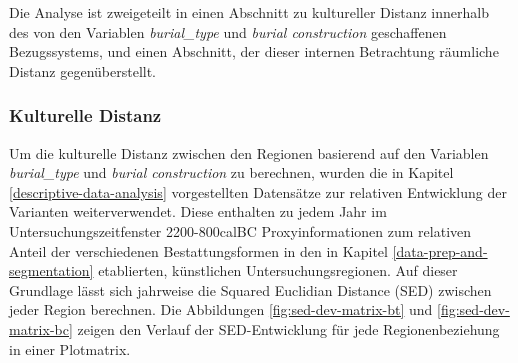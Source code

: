 \documentclass[openany,twoside,twocolumn]{book}
\begin{document}
Die Analyse ist zweigeteilt in einen Abschnitt zu kultureller Distanz
innerhalb des von den Variablen \emph{burial\_type} und \emph{burial
construction} geschaffenen Bezugssystems, und einen Abschnitt, der
dieser internen Betrachtung räumliche Distanz gegenüberstellt.

\hypertarget{kulturelle-distanz}{%
\subsubsection{Kulturelle Distanz}\label{kulturelle-distanz}}

Um die kulturelle Distanz zwischen den Regionen basierend auf den
Variablen \emph{burial\_type} und \emph{burial construction} zu
berechnen, wurden die in Kapitel \ref{descriptive-data-analysis}
vorgestellten Datensätze zur relativen Entwicklung der Varianten
weiterverwendet. Diese enthalten zu jedem Jahr im
Untersuchungszeitfenster 2200-800calBC Proxyinformationen zum relativen
Anteil der verschiedenen Bestattungsformen in den in Kapitel
\ref{data-prep-and-segmentation} etablierten, künstlichen
Untersuchungsregionen. Auf dieser Grundlage lässt sich jahrweise die
Squared Euclidian Distance (SED) zwischen jeder Region berechnen. Die
Abbildungen \ref{fig:sed-dev-matrix-bt} und \ref{fig:sed-dev-matrix-bc}
zeigen den Verlauf der SED-Entwicklung für jede Regionenbeziehung in
einer Plotmatrix.
\end{document}
